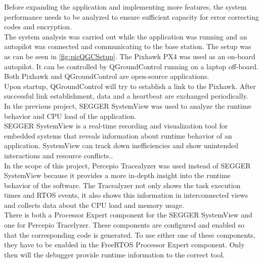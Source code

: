 %
%
Before expanding the application and implementing more features, the system performance needs to be analyzed to ensure sufficient capacity for error correcting codes and encryption.\\
The system analysis was carried out while the application was running and an autopilot was connected and communicating to the base station. The setup was as can be seen in \autoref{fig:picQGCSetup}. The Pixhawk PX4 was used as an on-board autopilot. It can be controlled by QGroundControl running on a laptop off-board. Both Pixhawk and QGroundControl are open-source applications.\\
Upon startup, QGroundControl will try to establish a link to the Pixhawk. After successful link establishment, data and a heartbeat are exchanged periodically.\\
In the previous project, SEGGER SystemView was used to analyze the runtime behavior and CPU load of the application.\\
SEGGER SystemView is a real-time recording and visualization tool for embedded systems that reveals information about runtime behavior of an application. SystemView can  track down inefficiencies and show unintended interactions and resource conflicts.\cite{SeggerSystemView}.\\
In the scope of this project, Percepio Tracealyzer was used instead of SEGGER SystemView because it provides a more in-depth insight into the runtime behavior of the software. The Tracealyzer not only shows the task execution times and RTOS events, it also shows this information in interconnected views and collects data about the CPU load and memory usage.\\
There is both a Processor Expert component for the SEGGER SystemView and one for Percepio Tracelyzer. These components are configured and enabled so that the corresponding code is generated. To use either one of these components, they have to be enabled in the FreeRTOS Processor Expert component. Only then will the debugger provide runtime information to the correct tool.\\
%
%

